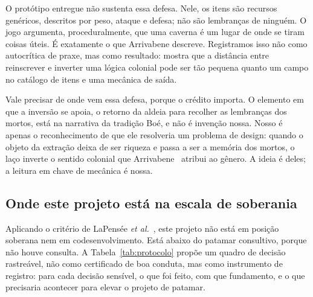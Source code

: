 \documentclass[conference]{IEEEtran}
\begin{document}
O protótipo entregue não sustenta essa defesa. Nele, os itens são recursos genéricos,
descritos por peso, ataque e defesa; não são lembranças de ninguém. O jogo argumenta,
proceduralmente, que uma caverna é um lugar de onde se tiram coisas úteis. É exatamente
o que Arrivabene descreve. Registramos isso não como autocrítica de praxe, mas como
resultado: mostra que a distância entre reinscrever e inverter uma lógica colonial pode
ser tão pequena quanto um campo no catálogo de itens e uma mecânica de saída.

Vale precisar de onde vem essa defesa, porque o crédito importa. O
elemento em que a inversão se apoia, o retorno da aldeia para recolher as lembranças dos
mortos, está na narrativa da tradição Boé, e não é invenção nossa. Nosso é apenas o
reconhecimento de que ele resolveria um problema de design: quando o objeto da extração
deixa de ser riqueza e passa a ser a memória dos mortos, o laço inverte o sentido colonial
que Arrivabene~\cite{arrivabene2025} atribui ao gênero. A ideia é deles; a leitura em
chave de mecânica é nossa.

\subsection{Onde este projeto está na escala de soberania}

Aplicando o critério de LaPensée \textit{et al.}~\cite{lapensee2022}, este projeto não
está em posição soberana nem em codesenvolvimento. Está abaixo do patamar consultivo,
porque não houve consulta. A Tabela~\ref{tab:protocolo} propõe um quadro de decisão
rastreável, não como certificado de boa conduta, mas como instrumento de registro: para
cada decisão sensível, o que foi feito, com que fundamento, e o que precisaria acontecer
para elevar o projeto de patamar.
\end{document}
